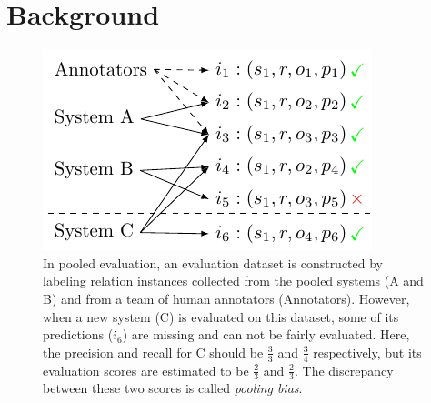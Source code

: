 \section{Background}
\label{sec:setup}
\begin{figure}[t]
  \centering
  \includegraphics[width=0.9\columnwidth]{figures/pooling}
  \caption{\label{fig:pooling}
  In pooled evaluation, an evaluation dataset is constructed by labeling relation instances collected from the pooled systems (A and B) and from a team of human annotators (Annotators).
  However, when a new system (C) is evaluated on this dataset, some of its predictions ($i_6$) are missing and can not be fairly evaluated.
  Here, the precision and recall for C should be $\frac{3}{3}$ and $\frac{3}{4}$ respectively, but its evaluation scores are estimated to be $\frac{2}{3}$ and $\frac{2}{3}$.
  The discrepancy between these two scores is called \textit{pooling bias}.
  }
\end{figure}

